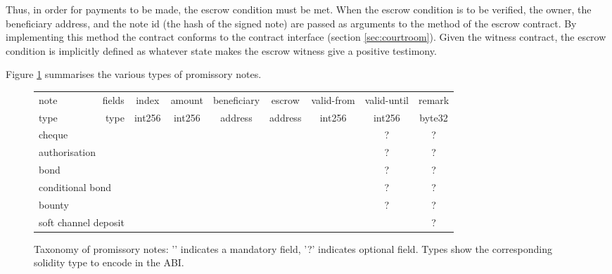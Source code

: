 Thus, in order for payments to be made, the escrow condition must be met. When the escrow condition is to be verified, the owner, the beneficiary address, and the note id (the hash of the signed note) are passed as arguments to the {} method of the escrow contract. By implementing this method the contract conforms to the  contract  interface (section \ref{sec:courtroom}). Given the witness contract, the escrow condition is implicitly defined as whatever state makes the escrow witness give a positive testimony. 


Figure \ref{fig:taxonomy} summarises the various types of promissory notes.

\newcommand{\tick}{\checkmark}
\newcommand{\opt}{?}
\begin{center}
\begin{figure}
\begin{center}
\begin{tabular}{|l|r||c|c|c|c|c|c|c|}
\hline
note & fields
& index
& amount
& beneficiary
& escrow
& valid-from
& valid-until
& remark
\\
\cline{2-9}

type & type 
& int256
& int256
& address
& address
& int256
& int256
& byte32
\\
\hline
\hline
\multicolumn{2}{|l||}{cheque}   & \tick & \tick & \tick & & & \opt& \opt
\\
\multicolumn{2}{|l||}{authorisation} &  & \tick & \tick & & & \opt& \opt
\\
\multicolumn{2}{|l||}{bond} & \tick & \tick & \tick & & \tick & \opt& \opt
\\
\multicolumn{2}{|l||}{conditional bond} &  & \tick & \tick & \tick & \tick & \opt& \opt
\\
\multicolumn{2}{|l||}{bounty} & \tick &  \tick & & \tick & \tick & \opt& \opt
\\
\multicolumn{2}{|l||}{soft channel deposit} &  \tick & \tick & & & && \opt
\\
\hline
\end{tabular}
\end{center}
\caption{Taxonomy of promissory notes: '\tick' indicates a mandatory field, '?' indicates optional field. Types show the corresponding solidity type to encode in the ABI. }
\label{fig:taxonomy}
\end{figure}
\end{center}




